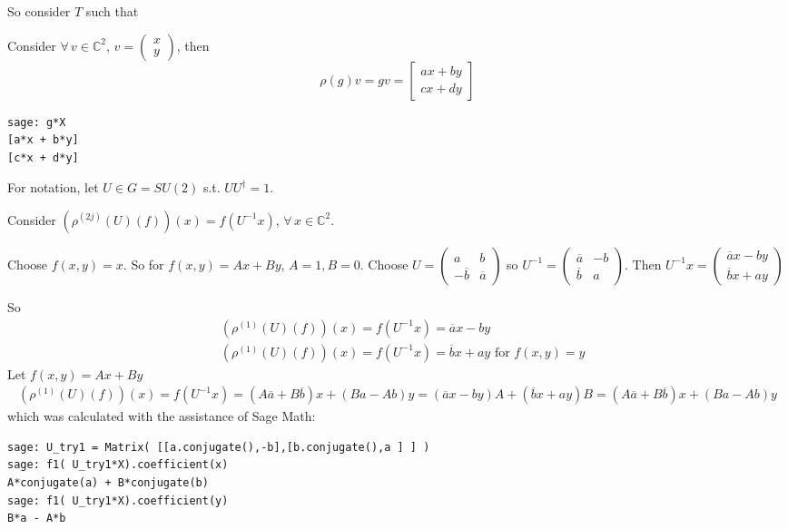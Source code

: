 \documentclass[10pt]{amsart}
\begin{document}
\begin{multicols*}{2}
So consider $T$ such that 


Consider $\forall \, v \in \mathbb{C}^2$, $v =\left( \begin{matrix} x \\ y \end{matrix} \right)$, then 
\[
\rho(g)v = gv = \left[ \begin{matrix} ax + by \\ cx + dy \end{matrix} \right]
\]

\begin{lstlisting}
sage: g*X
[a*x + b*y]
[c*x + d*y]
\end{lstlisting}

For notation, let $U \in G = SU(2)$ s.t. $UU^{\dag}=1$.  

Consider $(\rho^{(2j)}(U)(f))(x) = f(U^{-1}x)$, $\forall \, x \in \mathbb{C}^2$.  

Choose $f(x,y) = x$.  So for $f(x,y) = Ax+By$, $A=1,B=0$.  Choose $U = \left( \begin{matrix} a & b \\
  -\overline{b} & \overline{a} \end{matrix} \right)$ so $U^{-1} = \left( \begin{matrix} \overline{a} & -b \\
  \overline{b} & a \end{matrix} \right)$.  Then $U^{-1}x = \left( \begin{matrix} \overline{a}x - by \\
  \overline{b}x + ay \end{matrix} \right)$

So 
\[
\begin{aligned}
  & (\rho^{(1)}(U)(f) )(x) = f(U^{-1}x) = \overline{a}x - by \\ 
  & (\rho^{(1)}(U)(f))(x) = f(U^{-1}x) = \overline{b}x + ay \text{ for } f(x,y) = y 
\end{aligned}
\]
Let $f(x,y) = Ax + By$
\[
\begin{gathered}
  (\rho^{(1)}(U)(f))(x) = f(U^{-1}x) = (A\overline{a}+B\overline{b})x + (Ba - Ab)y = (\overline{a}x - by)A + (\overline{b}x + ay)B  = (A\overline{a} + B\overline{b})x + (Ba-Ab)y
\end{gathered}
\]
which was calculated with the assistance of Sage Math:
\begin{lstlisting}
sage: U_try1 = Matrix( [[a.conjugate(),-b],[b.conjugate(),a ] ] )
sage: f1( U_try1*X).coefficient(x)
A*conjugate(a) + B*conjugate(b)
sage: f1( U_try1*X).coefficient(y)
B*a - A*b
\end{lstlisting}


\end{multicols*}
\end{document}

